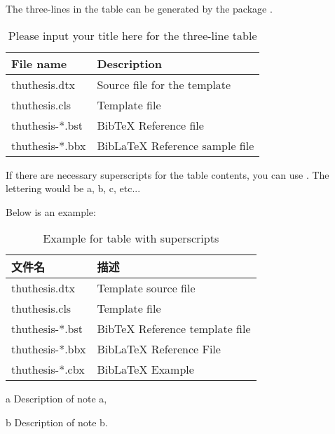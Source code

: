 The three-lines in the table can be generated by the package .

\begin{table}
  \centering
  \caption{Please input your title here for the three-line table}
  \begin{tabular}{ll}
    \toprule
    File name          & Description               \\
    \midrule
    thuthesis.dtx   & Source file for the template \\
    thuthesis.cls   & Template file                \\
    thuthesis-*.bst & BibTeX Reference file        \\
    thuthesis-*.bbx & BibLaTeX Reference sample file \\
   
    \bottomrule
  \end{tabular}
  \label{tab:three-line}
\end{table}

If there are necessary superscripts for the table contents, you can use . The lettering would be a, b, c, etc...

Below is an example:

\begin{table}
  \centering
  \begin{threeparttable}[c]
    \caption{Example for table with superscripts}
    \label{tab:three-part-table}
    \begin{tabular}{ll}
      \toprule
      文件名                 & 描述                         \\
      \midrule
      thuthesis.dtx\tnote{a} & Template source file \\
      thuthesis.cls\tnote{b} & Template file        \\
      thuthesis-*.bst        & BibTeX Reference template file                                 \\
      thuthesis-*.bbx        & BibLaTeX Reference File                                               \\
      thuthesis-*.cbx        & BibLaTeX Example     \\
      \bottomrule
    \end{tabular}
    \begin{tablenotes}
      \item [a] Description of note a,
      \item [b] Description of note b.
    \end{tablenotes}
  \end{threeparttable}
\end{table}
